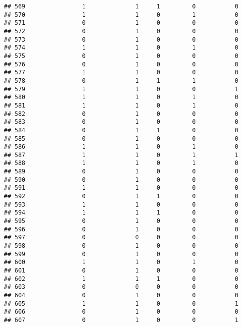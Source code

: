 \documentclass[]{article}
\begin{document}
\begin{verbatim}
## 569                1              1     1         0           0
## 570                1              1     0         1           0
## 571                0              1     0         0           0
## 572                0              1     0         0           0
## 573                0              1     0         0           0
## 574                1              1     0         1           0
## 575                0              1     0         0           0
## 576                0              1     0         0           0
## 577                1              1     0         0           0
## 578                0              1     1         1           0
## 579                1              1     0         0           1
## 580                1              1     0         1           0
## 581                1              1     0         1           0
## 582                0              1     0         0           0
## 583                0              1     0         0           0
## 584                0              1     1         0           0
## 585                0              1     0         0           0
## 586                1              1     0         1           0
## 587                1              1     0         1           1
## 588                1              1     0         1           0
## 589                0              1     0         0           0
## 590                0              1     0         0           0
## 591                1              1     0         0           0
## 592                0              1     1         0           0
## 593                1              1     0         0           0
## 594                1              1     1         0           0
## 595                0              1     0         0           0
## 596                0              1     0         0           0
## 597                0              0     0         0           0
## 598                0              1     0         0           0
## 599                0              1     0         0           0
## 600                1              1     0         1           0
## 601                0              1     0         0           0
## 602                1              1     1         0           0
## 603                0              0     0         0           0
## 604                0              1     0         0           0
## 605                1              1     0         0           1
## 606                0              1     0         0           0
## 607                0              1     0         0           1

\end{verbatim}
\end{document}
